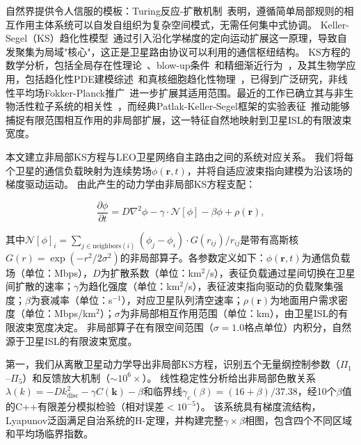 \documentclass[sn-nature,pdflatex]{sn-jnl}
\begin{document}
自然界提供令人信服的模板：Turing反应-扩散机制~\cite{turing_1952}表明，遵循简单局部规则的相互作用主体系统可以自发自组织为复杂空间模式，无需任何集中式协调。
Keller-Segel（KS）趋化性模型~\cite{keller_segel_1970,keller_segel_1971}通过引入沿化学梯度的定向运动扩展这一原理，导致自发聚集为局域"核心"，这正是卫星路由协议可以利用的通信枢纽结构。
KS方程的数学分析，包括全局存在性理论~\cite{horstmann_2003}、blow-up条件~\cite{blanchet_2012}和精细渐近行为~\cite{calvez_carrillo_2016}，及其生物学应用，包括趋化性PDE建模综述~\cite{hillen_painter_2009,painter_2019}和真核细胞趋化性物理~\cite{levine_rappel_2013}，已得到广泛研究，非线性平均场Fokker-Planck推广~\cite{chavanis_2008}进一步扩展其适用范围。最近的工作已确立其与非生物活性粒子系统的相关性~\cite{carrillo_2020_ks_phase,bruna_2025_lane}，而经典Patlak-Keller-Segel框架的实验表征~\cite{phan_2024_pnas}推动能够捕捉有限范围相互作用的非局部扩展，这一特征自然地映射到卫星ISL的有限波束宽度。

本文建立非局部KS方程与LEO卫星网络自主路由之间的系统对应关系。
我们将每个卫星的通信负载映射为连续势场$\phi(\mathbf{r},t)$，并将自适应波束指向建模为沿该场的梯度驱动运动。
由此产生的动力学由非局部KS方程支配：

\begin{equation}
\label{eq:ks_nonlocal}
\frac{\partial \phi}{\partial t} = D \nabla^2 \phi - \gamma \cdot \mathcal{N}[\phi] - \beta \phi + \rho(\mathbf{r}),
\end{equation}

其中$\mathcal{N}[\phi]_i = \sum_{j \in \text{neighbors}(i)} (\phi_j - \phi_i) \cdot G(r_{ij})/r_{ij}$是带有高斯核$G(r)=\exp(-r^2/2\sigma^2)$的非局部算子。各参数定义如下：$\phi(\mathbf{r},t)$为通信负载场（单位：Mbps），$D$为扩散系数（单位：km$^2$/s），表征负载通过星间切换在卫星间扩散的速率；$\gamma$为趋化强度（单位：km$^2$/s），表征波束指向驱动的负载聚集强度；$\beta$为衰减率（单位：s$^{-1}$），对应卫星队列清空速率；$\rho(\mathbf{r})$为地面用户需求密度（单位：Mbps/km$^2$）；$\sigma$为非局部相互作用范围（单位：km），由卫星ISL的有限波束宽度决定。
非局部算子在有限空间范围（$\sigma = 1.0$格点单位）内积分，自然源于卫星ISL的有限波束宽度。

第一，我们从离散卫星动力学导出非局部KS方程，识别五个无量纲控制参数（$\Pi_1$--$\Pi_5$）和反馈放大机制（$\sim 10^6\times$）。
线性稳定性分析给出非局部色散关系$\lambda(k) = -D k^2_{\text{disc}} - \gamma C(\mathbf{k}) - \beta$和临界线$\gamma_c(\beta) = (16+\beta)/37.38$，经10个$\beta$值的C++有限差分模拟检验（相对误差$<10^{-5}$）。
该系统具有梯度流结构，Lyapunov泛函满足自治系统的H-定理，并构建完整$\gamma \times \beta$相图，包含四个不同区域和平均场临界指数。
\end{document}
